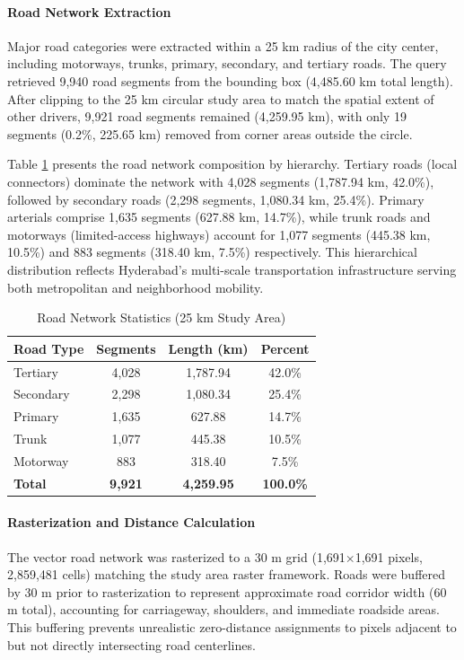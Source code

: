 \documentclass[12pt,a4paper]{article}
\begin{document}
\paragraph{Road Network Extraction}
Major road categories were extracted within a 25 km radius of the city center, including motorways, trunks, primary, secondary, and tertiary roads. The query retrieved 9,940 road segments from the bounding box (4,485.60 km total length). After clipping to the 25 km circular study area to match the spatial extent of other drivers, 9,921 road segments remained (4,259.95 km), with only 19 segments (0.2\%, 225.65 km) removed from corner areas outside the circle.

Table \ref{tab:road_network} presents the road network composition by hierarchy. Tertiary roads (local connectors) dominate the network with 4,028 segments (1,787.94 km, 42.0\%), followed by secondary roads (2,298 segments, 1,080.34 km, 25.4\%). Primary arterials comprise 1,635 segments (627.88 km, 14.7\%), while trunk roads and motorways (limited-access highways) account for 1,077 segments (445.38 km, 10.5\%) and 883 segments (318.40 km, 7.5\%) respectively. This hierarchical distribution reflects Hyderabad's multi-scale transportation infrastructure serving both metropolitan and neighborhood mobility.

\begin{table}[H]
\caption{Road Network Statistics (25 km Study Area)}
\label{tab:road_network}
\centering
\small
\renewcommand{\arraystretch}{1.2}
\begin{tabular}{lccc}
\toprule
\textbf{Road Type} & \textbf{Segments} & \textbf{Length (km)} & \textbf{Percent} \\
\midrule
Tertiary & 4,028 & 1,787.94 & 42.0\% \\
Secondary & 2,298 & 1,080.34 & 25.4\% \\
Primary & 1,635 & 627.88 & 14.7\% \\
Trunk & 1,077 & 445.38 & 10.5\% \\
Motorway & 883 & 318.40 & 7.5\% \\
\midrule
\textbf{Total} & \textbf{9,921} & \textbf{4,259.95} & \textbf{100.0\%} \\
\bottomrule
\end{tabular}
\end{table}

\paragraph{Rasterization and Distance Calculation}
The vector road network was rasterized to a 30 m grid (1,691$\times$1,691 pixels, 2,859,481 cells) matching the study area raster framework. Roads were buffered by 30 m prior to rasterization to represent approximate road corridor width (60 m total), accounting for carriageway, shoulders, and immediate roadside areas. This buffering prevents unrealistic zero-distance assignments to pixels adjacent to but not directly intersecting road centerlines.
\end{document}
